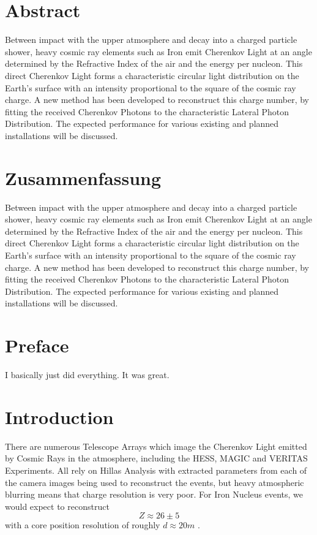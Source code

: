 \documentclass{article}
\begin{document}
\section*{Abstract}
Between impact with the upper atmosphere and decay into a charged particle shower, heavy cosmic ray elements such as Iron emit Cherenkov Light at an angle determined by the Refractive Index of the air and the energy per nucleon. This direct Cherenkov Light forms a characteristic circular light distribution on the Earth's surface with an intensity proportional to the square of the cosmic ray charge. A new method has been developed to reconstruct this charge number, by fitting the received Cherenkov Photons to the characteristic Lateral Photon Distribution. The expected performance for various existing and planned installations will be discussed.

\section*{Zusammenfassung}
Between impact with the upper atmosphere and decay into a charged particle shower, heavy cosmic ray elements such as Iron emit Cherenkov Light at an angle determined by the Refractive Index of the air and the energy per nucleon. This direct Cherenkov Light forms a characteristic circular light distribution on the Earth's surface with an intensity proportional to the square of the cosmic ray charge. A new method has been developed to reconstruct this charge number, by fitting the received Cherenkov Photons to the characteristic Lateral Photon Distribution. The expected performance for various existing and planned installations will be discussed.
\newpage
\tableofcontents
\newpage

\section{Preface}
I basically just did everything. It was great.
\newpage

\section{Introduction}
There are numerous Telescope Arrays which image the Cherenkov Light emitted by Cosmic Rays in the atmosphere, including the HESS, MAGIC and VERITAS Experiments. All rely on Hillas Analysis with extracted parameters from each of the camera images being used to reconstruct the events, but heavy atmospheric blurring means that charge resolution is very poor. For Iron Nucleus events, we would expect to reconstruct \[Z \approx 26 \pm 5 \] with a core position resolution of roughly $d \approx 20 m $ \cite{hess07}. 
\end{document}
